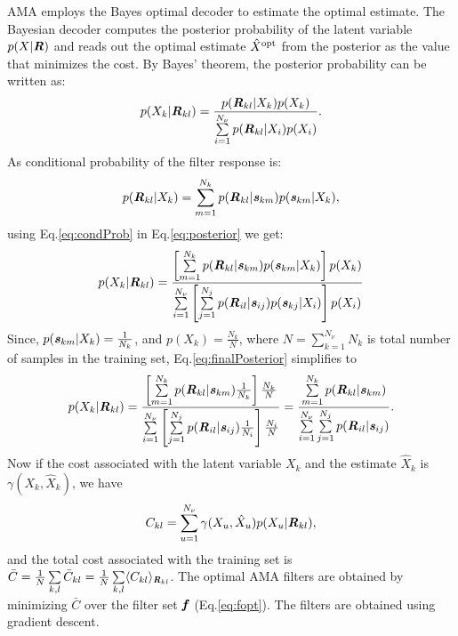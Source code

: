 \documentclass{jov}
\begin{document}
AMA employs the Bayes optimal decoder to estimate the optimal estimate. The Bayesian decoder computes the posterior probability of the latent variable $p(X|{\textbf {\textit R}})$ and reads out the optimal estimate $\hat{X}^{\rm opt}$ from the posterior as the value that minimizes the cost. By Bayes' theorem, the posterior probability can be written as:
\begin{align}
p(X_k|{\textbf {\textit R} }_{kl}) = \frac{p({\textbf {\textit R} }_{kl}|X_k)p(X_k)}{\sum\limits_{i=1}^{N_{\nu}}{p({\textbf {\textit R} }_{kl}|X_i)p(X_i)}}.
\label{eq:posterior}
\end{align}
As conditional probability of the filter response is:
\begin{align}
p({\textbf {\textit R} }_{kl}|X_k) = \sum\limits_{m=1}^{N_k}p({\textbf {\textit R} }_{kl}|{\textbf {\textit s} }_{km})p({\textbf {\textit s} }_{km}|X_k),
\label{eq:condProb}
\end{align}
using Eq.\ref{eq:condProb} in Eq.\ref{eq:posterior} we get:
\begin{align}
p(X_k|{\textbf {\textit R} }_{kl}) = \frac{\left[\sum\limits_{m=1}^{N_k}p({\textbf {\textit R} }_{kl}|{\textbf {\textit s} }_{km})p({\textbf {\textit s} }_{km}|X_k)\right]p(X_k)}{\sum\limits_{i=1}^{N_{\nu}}{\left[\sum\limits_{j=1}^{N_j}p({\textbf {\textit R} }_{il}|{\textbf {\textit s} }_{ij})p({\textbf {\textit s} }_{kj}|X_i)\right]p(X_i)}}
\label{eq:finalPosterior}
\end{align}
Since, $p({\textbf {\textit s} }_{km}|X_k) = \frac{1}{N_k}$, and $p(X_k)=\frac{N_k}{N}$, where $N = \sum\limits_{k=1}^{N_{\nu}}N_{k}$ is total number of samples in the training set, Eq.\ref{eq:finalPosterior} simplifies to
\begin{align}
p(X_k|{\textbf {\textit R} }_{kl}) = \frac{\left[\sum\limits_{m=1}^{N_k}p({\textbf {\textit R} }_{kl}|{\textbf {\textit s} }_{km}) \frac{1}{N_k}\right]\frac{N_k}{N}}{\sum\limits_{i=1}^{N_{\nu}}{\left[\sum\limits_{j=1}^{N_j}p({\textbf {\textit R} }_{il}|{\textbf {\textit s} }_{ij}) \frac{1}{N_i}\right]\frac{N_i}{N}}} = \frac{\sum\limits_{m=1}^{N_k}p({\textbf {\textit R} }_{kl}|{\textbf {\textit s} }_{km})}{\sum\limits_{i=1}^{N_{\nu}}{\sum\limits_{j=1}^{N_j}p({\textbf {\textit R} }_{il}|{\textbf {\textit s} }_{ij})}}.
\label{eq:simplifiedPosterior}
\end{align}
Now if the cost associated with the latent variable $X_k$ and the estimate $\hat{X}_k$ is $\gamma (X_k,\hat{X}_k)$, we have  
\begin{align}
C_{kl} = \sum\limits_{u=1}^{N_{\nu}}\gamma(X_u,\hat{X}_u)p(X_u|{\textbf{\textit R}}_{kl}),
\end{align}
and the total cost associated with the training set is $\bar{C} = \frac{1}{N} \sum\limits_{k,l}\bar{C}_{kl} = \frac{1}{N} \sum\limits_{k,l}\langle C_{kl}\rangle_{{\textbf{\textit R}}_{kl}}$. The optimal AMA filters are obtained by minimizing $\bar{C}$ over the filter set ${\textbf {\textit f} }$ (Eq.\ref{eq:fopt}). The filters are obtained using gradient descent.
\end{document}
